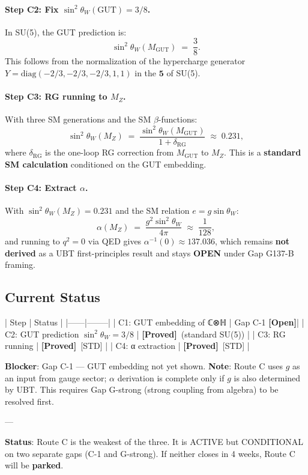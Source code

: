 \documentclass[12pt,a4paper]{article}
\theoremstyle{definition}
\theoremstyle{remark}
\newcommand{\PROVED}{\textbf{[Proved]}}
\newcommand{\OPEN}{\textbf{[Open]}}
\begin{document}
\paragraph{Step C2: Fix $\sin^2\theta_W(\mathrm{GUT}) = 3/8$.}
In SU(5), the GUT prediction is:
\[
  \sin^2\theta_W(M_{\mathrm{GUT}}) \;=\; \frac{3}{8}.
\]
This follows from the normalization of the hypercharge generator
$Y = \mathrm{diag}(-2/3,-2/3,-2/3,1,1)$ in the $\mathbf{5}$ of SU(5).

\paragraph{Step C3: RG running to $M_Z$.}
With three SM generations and the SM $\beta$-functions:
\[
  \sin^2\theta_W(M_Z)
  \;=\;
  \frac{\sin^2\theta_W(M_{\mathrm{GUT}})}{1 + \delta_{\mathrm{RG}}}
  \;\approx\; 0.231,
\]
where $\delta_{\mathrm{RG}}$ is the one-loop RG correction from
$M_{\mathrm{GUT}}$ to $M_Z$.
This is a \textbf{standard SM calculation} conditioned on the GUT embedding.

\paragraph{Step C4: Extract $\alpha$.}
With $\sin^2\theta_W(M_Z) = 0.231$ and the SM relation
$e = g\sin\theta_W$:
\[
  \alpha(M_Z) \;=\; \frac{g^2\sin^2\theta_W}{4\pi}
             \;\approx\; \frac{1}{128},
\]
and running to $q^2 = 0$ via QED gives $\alpha^{-1}(0) \approx 137.036$,
which remains \textbf{not derived} as a UBT first-principles result and
stays \textbf{OPEN} under Gap G137-B framing.

\subsection{Current Status}

| Step | Status |
|------|--------|
| C1: GUT embedding of ℂ⊗ℍ | Gap C-1 \OPEN |
| C2: GUT prediction $\sin^2\theta_W = 3/8$ | \PROVED\ (standard SU(5)) |
| C3: RG running | \PROVED\ [STD] |
| C4: α extraction | \PROVED\ [STD] |

\textbf{Blocker}: Gap C-1 — GUT embedding not yet shown.
\textbf{Note}: Route C uses $g$ as an input from gauge sector; $\alpha$
derivation is complete only if $g$ is also determined by UBT.
This requires Gap G-strong (strong coupling from algebra) to be resolved first.

---

\textbf{Status}: Route C is the weakest of the three.
It is ACTIVE but CONDITIONAL on two separate gaps (C-1 and G-strong).
If neither closes in 4 weeks, Route C will be \textbf{parked}.
\end{document}
